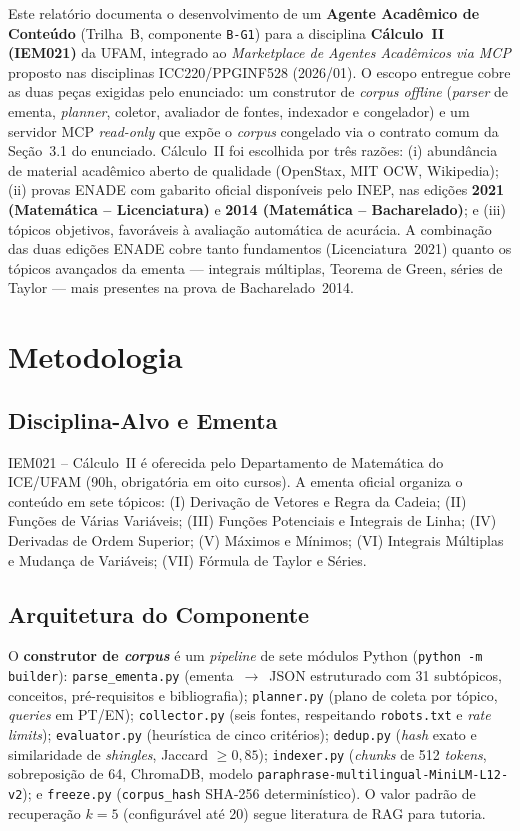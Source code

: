 \documentclass[12pt]{article}
\begin{document}
Este relatório documenta o desenvolvimento de um \textbf{Agente Acadêmico de Conteúdo}
(Trilha~B, componente \texttt{B-G1}) para a disciplina \textbf{Cálculo~II (IEM021)} da UFAM,
integrado ao \textit{Marketplace de Agentes Acadêmicos via MCP} proposto nas disciplinas
ICC220/PPGINF528 (2026/01). O escopo entregue cobre as duas peças exigidas pelo enunciado: um
construtor de \textit{corpus offline} (\textit{parser} de ementa, \textit{planner}, coletor,
avaliador de fontes, indexador e congelador) e um servidor MCP \textit{read-only} que expõe o
\textit{corpus} congelado via o contrato comum da Seção~3.1 do enunciado. Cálculo~II foi escolhida
por três razões: (i) abundância de material acadêmico aberto de qualidade (OpenStax, MIT OCW,
Wikipedia); (ii) provas ENADE com gabarito oficial disponíveis pelo INEP, nas edições
\textbf{2021 (Matemática -- Licenciatura)} e \textbf{2014 (Matemática -- Bacharelado)}; e
(iii) tópicos objetivos, favoráveis à avaliação automática de acurácia. A combinação das duas
edições ENADE cobre tanto fundamentos (Licenciatura~2021) quanto os tópicos avançados da ementa
--- integrais múltiplas, Teorema de Green, séries de Taylor --- mais presentes na prova de
Bacharelado~2014.

\section{Metodologia}

\subsection{Disciplina-Alvo e Ementa}

IEM021 -- Cálculo~II é oferecida pelo Departamento de Matemática do ICE/UFAM (90h, obrigatória em
oito cursos). A ementa oficial organiza o conteúdo em sete tópicos: (I) Derivação de Vetores e
Regra da Cadeia; (II) Funções de Várias Variáveis; (III) Funções Potenciais e Integrais de Linha;
(IV) Derivadas de Ordem Superior; (V) Máximos e Mínimos; (VI) Integrais Múltiplas e Mudança de
Variáveis; (VII) Fórmula de Taylor e Séries.

\subsection{Arquitetura do Componente}

O \textbf{construtor de \textit{corpus}} é um \textit{pipeline} de sete módulos Python
(\texttt{python -m builder}): \texttt{parse\_ementa.py} (ementa~$\rightarrow$~JSON estruturado
com 31 subtópicos, conceitos, pré-requisitos e bibliografia); \texttt{planner.py} (plano de coleta
por tópico, \textit{queries} em PT/EN); \texttt{collector.py} (seis fontes, respeitando
\texttt{robots.txt} e \textit{rate limits}); \texttt{evaluator.py} (heurística de cinco
critérios); \texttt{dedup.py} (\textit{hash} exato e similaridade de \textit{shingles}, Jaccard
$\geq 0{,}85$); \texttt{indexer.py} (\textit{chunks} de 512 \textit{tokens}, sobreposição de 64,
ChromaDB, modelo \texttt{paraphrase-multilingual-MiniLM-L12-v2}); e \texttt{freeze.py}
(\texttt{corpus\_hash} SHA-256 determinístico). O valor padrão de recuperação $k=5$
(configurável até 20) segue literatura de RAG para tutoria.
\end{document}
